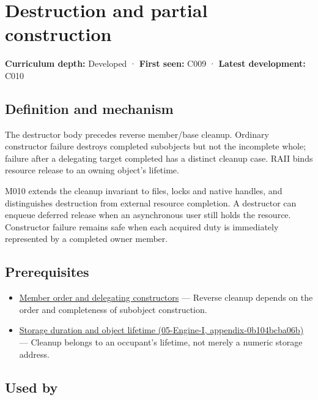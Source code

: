\hypertarget{appendix-9bfe377cef7a}{}
\section{Destruction and partial construction}\label{appendix-9bfe377cef7a-destruction-and-partial-construction}

\textbf{Curriculum depth:} Developed · \textbf{First seen:} C009 · \textbf{Latest development:} C010

\subsection{Definition and mechanism}\label{appendix-9bfe377cef7a-definition-and-mechanism}

The destructor body precedes reverse member/base cleanup. Ordinary constructor failure destroys completed subobjects but not the incomplete whole; failure after a delegating target completed has a distinct cleanup case. RAII binds resource release to an owning object's lifetime.

M010 extends the cleanup invariant to files, locks and native handles, and distinguishes destruction from external resource completion. A destructor can enqueue deferred release when an asynchronous user still holds the resource. Constructor failure remains safe when each acquired duty is immediately represented by a completed owner member.

\subsection{Prerequisites}\label{appendix-9bfe377cef7a-prerequisites}

\begin{itemize}
\tightlist
\item
  \hyperref[appendix-3cb49709605a]{Member order and delegating constructors} --- Reverse cleanup depends on the order and completeness of subobject construction.
\item
  \href{../05-Engine-I/main.pdf\#nameddest=appendix-0b104bcba06b}{Storage duration and object lifetime (05-Engine-I, appendix-0b104bcba06b)} --- Cleanup belongs to an occupant's lifetime, not merely a numeric storage address.
\end{itemize}

\subsection{Used by}\label{appendix-9bfe377cef7a-used-by}

